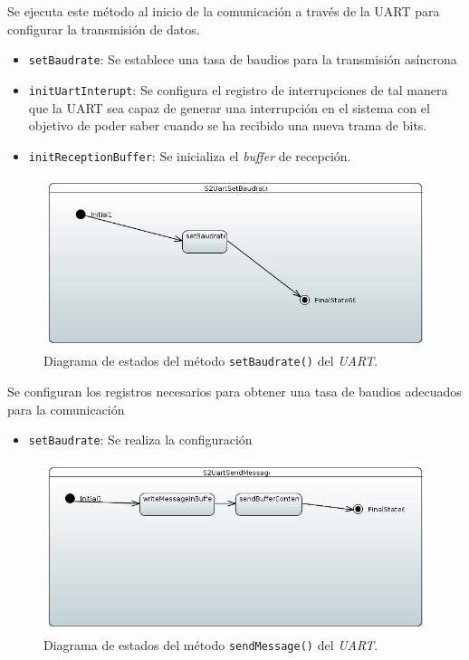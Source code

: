 Se ejecuta este método al inicio de la comunicación a través de la UART para configurar la transmisión de datos.

\begin{itemize}
    \item \texttt{setBaudrate}: Se establece una tasa de baudios para la transmisión asíncrona
    \item \texttt{initUartInterupt}: Se configura el registro de interrupciones de tal manera que la UART sea capaz de generar una interrupción en el sistema con el objetivo de poder saber cuando se ha recibido una nueva trama de bits.
    \item \texttt{initReceptionBuffer}: Se inicializa el \textit{buffer} de recepción.
    
\end{itemize}

\begin{figure}[H]
    \centering
    \includegraphics[width=1\linewidth]{pictures/S2UartSetBaudrate.PNG}
    \caption{Diagrama de estados del método \texttt{setBaudrate()} del \textit{UART}.}
    \label{fig:fun_set_baudrate_uart}
\end{figure}

Se configuran los registros necesarios para obtener una tasa de baudios adecuados para la comunicación

\begin{itemize}
    \item \texttt{setBaudrate}: Se realiza la configuración 
\end{itemize}

\begin{figure}[H]
    \centering
    \includegraphics[width=1\linewidth]{pictures/S2UartSendMessage.PNG}
    \caption{Diagrama de estados del método \texttt{sendMessage()} del \textit{UART}.}
    \label{fig:fun_send_message_uart}
\end{figure}

